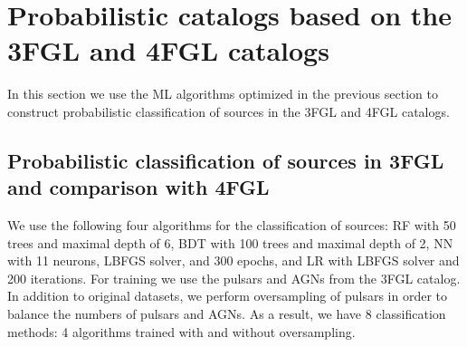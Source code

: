 \section{Probabilistic catalogs based on the 3FGL and 4FGL catalogs}

In this section we use the ML algorithms optimized in the previous section to construct probabilistic
classification of sources in the 3FGL and 4FGL catalogs.



\subsection{Probabilistic classification of sources in 3FGL and comparison with 4FGL}


We use the following four algorithms for the classification of sources: RF with 50 trees and maximal depth of 6, BDT with 100 trees and maximal depth of 2, NN with 11 neurons, LBFGS solver, and 300 epochs, and LR with LBFGS solver and 200 iterations. 
For training we use the pulsars and AGNs from the 3FGL catalog. In addition to original datasets, we perform oversampling of pulsars in order to balance the numbers of pulsars and AGNs.
As a result, we have 8 classification methods: 4 algorithms trained with and without oversampling.


\begin{table}[!h]
\hspace{-0.2cm}
    \vspace{2mm}
    \caption{Testing accuracy of the 4 selected algorithms for classification of 3FGL sources and comparison with associations in the 4FGL-DR2 catalog. 
    ``\_O'' denotes training with oversampling.}
    \label{tab:selected_algs}
\end{table}



